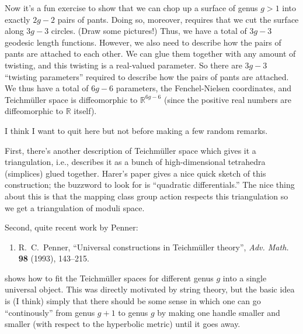 \documentclass[12pt]{article}
\def\tightlist{}
\begin{document}
Now it's a fun exercise to show that we can chop up a surface of genus
\(g > 1\) into exactly \(2g-2\) pairs of pants. Doing so, moreover,
requires that we cut the surface along \(3g-3\) circles. (Draw some
pictures!) Thus, we have a total of \(3g-3\) geodesic length functions.
However, we also need to describe how the pairs of pants are attached to
each other. We can glue them together with any amount of twisting, and
this twisting is a real-valued parameter. So there are \(3g-3\)
``twisting parameters'' required to describe how the pairs of pants are
attached. We thus have a total of \(6g-6\) parameters, the
Fenchel-Nielsen coordinates, and Teichm\"uller space is diffeomorphic to
\(\mathbb{R}^{6g-6}\) (since the positive real numbers are diffeomorphic
to \(\mathbb{R}\) itself).

I think I want to quit here but not before making a few random remarks.

First, there's another description of Teichm\"uller space which gives it
a triangulation, i.e., describes it as a bunch of high-dimensional
tetrahedra (simplices) glued together. Harer's paper gives a nice quick
sketch of this construction; the buzzword to look for is ``quadratic
differentials.'' The nice thing about this is that the mapping class
group action respects this triangulation so we get a triangulation of
moduli space.

Second, quite recent work by Penner:

\begin{enumerate}
\def\labelenumi{\arabic{enumi})}
\setcounter{enumi}{7}
\tightlist
\item
  R.\ C.\ Penner, ``Universal constructions in Teichm\"uller theory'', 
  \emph{Adv. Math.} \textbf{98} (1993), 143--215.
\end{enumerate}
\noindent
shows how to fit the Teichm\"uller spaces for different genus \(g\) into
a single universal object. This was directly motivated by string theory,
but the basic idea is (I think) simply that there should be some sense
in which one can go ``continously'' from genus \(g+1\) to genus \(g\) by
making one handle smaller and smaller (with respect to the hyperbolic
metric) until it goes away.
\end{document}
